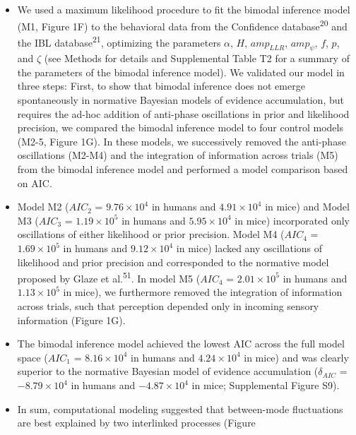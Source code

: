 \documentclass[
]{article}
\begin{document}
\begin{itemize}
\item
  We used a maximum likelihood procedure to fit the bimodal inference
  model (M1, Figure 1F) to the behavioral data from the Confidence
  database\textsuperscript{20} and the IBL database\textsuperscript{21},
  optimizing the parameters \(\alpha\), \(H\), \(amp_{LLR}\),
  \(amp_{\psi}\), \(f\), \(p\), and \(\zeta\) (see Methods for details
  and Supplemental Table T2 for a summary of the parameters of the
  bimodal inference model). We validated our model in three steps:
  First, to show that bimodal inference does not emerge spontaneously in
  normative Bayesian models of evidence accumulation, but requires the
  ad-hoc addition of anti-phase oscillations in prior and likelihood
  precision, we compared the bimodal inference model to four control
  models (M2-5, Figure 1G). In these models, we successively removed the
  anti-phase oscillations (M2-M4) and the integration of information
  across trials (M5) from the bimodal inference model and performed a
  model comparison based on AIC.
\item
  Model M2 (\(AIC_2\) = \(\ensuremath{9.76\times 10^{4}}\) in humans and
  \(\ensuremath{4.91\times 10^{4}}\) in mice) and Model M3 (\(AIC_3\) =
  \(\ensuremath{1.19\times 10^{5}}\) in humans and
  \(\ensuremath{5.95\times 10^{4}}\) in mice) incorporated only
  oscillations of either likelihood or prior precision. Model M4
  (\(AIC_4\) = \(\ensuremath{1.69\times 10^{5}}\) in humans and
  \(\ensuremath{9.12\times 10^{4}}\) in mice) lacked any oscillations of
  likelihood and prior precision and corresponded to the normative model
  proposed by Glaze et al.\textsuperscript{51}. In model M5 (\(AIC_4\) =
  \(\ensuremath{2.01\times 10^{5}}\) in humans and
  \(\ensuremath{1.13\times 10^{5}}\) in mice), we furthermore removed
  the integration of information across trials, such that perception
  depended only in incoming sensory information (Figure 1G).
\item
  The bimodal inference model achieved the lowest AIC across the full
  model space (\(AIC_1\) = \(\ensuremath{8.16\times 10^{4}}\) in humans
  and \(\ensuremath{4.24\times 10^{4}}\) in mice) and was clearly
  superior to the normative Bayesian model of evidence accumulation
  (\(\delta_{AIC}\) = \(\ensuremath{-8.79\times 10^{4}}\) in humans and
  \(\ensuremath{-4.87\times 10^{4}}\) in mice; Supplemental Figure S9).
\item
  In sum, computational modeling suggested that between-mode
  fluctuations are best explained by two interlinked processes (Figure

\end{itemize}
\end{document}

